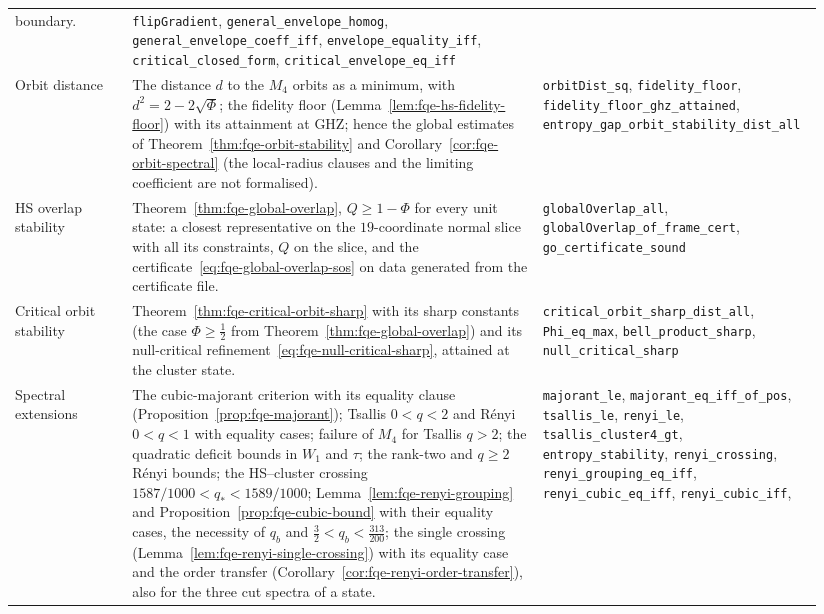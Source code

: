 {\begin{longtable}{@{}>{\raggedright\arraybackslash}p{0.14\linewidth}>{\raggedright\arraybackslash}p{0.49\linewidth}>{\raggedright\arraybackslash}p{0.31\linewidth}@{}}
boundary. &
\texttt{flipGradient}, \texttt{general\_envelope\_homog}, \texttt{general\_envelope\_coeff\_iff}, \texttt{envelope\_equality\_iff},
\texttt{critical\_closed\_form}, \texttt{critical\_envelope\_eq\_iff}\\
Orbit distance &
The distance $d$ to the $M_4$ orbits as a minimum, with $d^2=2-2\sqrt\Phi$; the fidelity floor
(Lemma~\ref{lem:fqe-hs-fidelity-floor}) with its attainment at GHZ; hence the global estimates of Theorem~\ref{thm:fqe-orbit-stability} and
Corollary~\ref{cor:fqe-orbit-spectral} (the local-radius clauses and the limiting coefficient are not formalised). &
\texttt{orbitDist\_sq}, \texttt{fidelity\_floor}, \texttt{fidelity\_floor\_ghz\_attained}, \texttt{entropy\_gap\_orbit\_\allowbreak stability\_dist\_all}\\
HS overlap stability &
Theorem~\ref{thm:fqe-global-overlap}, $Q\ge1-\Phi$ for every unit state: a closest representative on the $19$-coordinate normal
slice with all its constraints, $Q$ on the slice, and the certificate~\eqref{eq:fqe-global-overlap-sos} on data generated from
the certificate file. &
\texttt{globalOverlap\_all}, \texttt{globalOverlap\_of\_frame\_cert}, \texttt{go\_certificate\_sound}\\
Critical orbit stability &
Theorem~\ref{thm:fqe-critical-orbit-sharp} with its sharp constants (the case $\Phi\ge\frac12$ from
Theorem~\ref{thm:fqe-global-overlap}) and its null-critical refinement~\eqref{eq:fqe-null-critical-sharp}, attained at
the cluster state. &
\texttt{critical\_orbit\_sharp\_\allowbreak dist\_all}, \texttt{Phi\_eq\_max}, \texttt{bell\_product\_sharp}, \texttt{null\_critical\_sharp}\\
Spectral extensions &
The cubic-majorant criterion with its equality clause (Proposition~\ref{prop:fqe-majorant}); Tsallis $0<q<2$ and R\'enyi $0<q<1$ with equality
cases; failure of $M_4$ for Tsallis $q>2$; the quadratic deficit bounds in $W_1$ and $\tau$; the rank-two and $q\ge2$
R\'enyi bounds; the HS--cluster crossing $1587/1000<q_*<1589/1000$; Lemma~\ref{lem:fqe-renyi-grouping} and
Proposition~\ref{prop:fqe-cubic-bound} with their equality cases, the necessity of $q_b$ and $\tfrac32<q_b<\tfrac{313}{200}$; the single crossing
(Lemma~\ref{lem:fqe-renyi-single-crossing}) with its equality case and the order transfer
(Corollary~\ref{cor:fqe-renyi-order-transfer}), also for the three cut spectra of a state. &
\texttt{majorant\_le}, \texttt{majorant\_eq\_iff\_of\_pos}, \texttt{tsallis\_le}, \texttt{renyi\_le}, \texttt{tsallis\_cluster4\_gt}, \texttt{entropy\_stability},
\texttt{renyi\_crossing}, \texttt{renyi\_grouping\_eq\_iff}, \texttt{renyi\_cubic\_eq\_iff}, \texttt{renyi\_cubic\_iff},

\end{longtable}}
